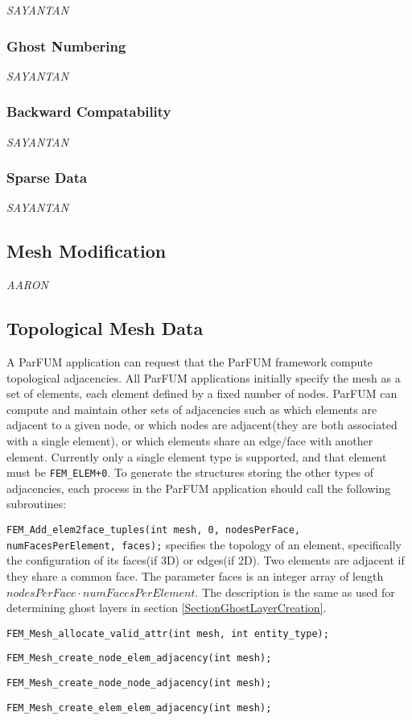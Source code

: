 {\it SAYANTAN}

\subsubsection{Ghost Numbering}

{\it SAYANTAN}

\subsubsection{Backward Compatability}

{\it SAYANTAN}

\subsubsection{Sparse Data}

{\it SAYANTAN}

\subsection{Mesh Modification}

{\it AARON}

\subsection{Topological Mesh Data}

A ParFUM application can request that the ParFUM framework compute topological adjacencies. All ParFUM applications initially specify the mesh as a set of elements, each element defined by a fixed number of nodes. ParFUM can compute and maintain other sets of adjacencies such as which elements are adjacent to a given node, or which nodes are adjacent(they are both associated with a single element), or which elements share an edge/face with another element. Currently only a single element type is supported, and that element must be \texttt{FEM\_ELEM+0}. To generate the structures storing the other types of adjacencies, each process in the ParFUM application should call the following subroutines:

\begin{list}{-}{}
\item \texttt{FEM\_Add\_elem2face\_tuples(int mesh, 0, nodesPerFace, numFacesPerElement, faces);} specifies the topology of an element, specifically the configuration of its faces(if 3D) or edges(if 2D). Two elements are adjacent if they share a common face. The parameter faces is an integer array of length $nodesPerFace \cdot numFacesPerElement$. The description is the same as used for determining ghost layers in section \ref{SectionGhostLayerCreation}.
\item \texttt{FEM\_Mesh\_allocate\_valid\_attr(int mesh, int entity\_type);}
\item \texttt{FEM\_Mesh\_create\_node\_elem\_adjacency(int mesh);}
\item \texttt{FEM\_Mesh\_create\_node\_node\_adjacency(int mesh);}
\item \texttt{FEM\_Mesh\_create\_elem\_elem\_adjacency(int mesh);}
\end{list}

